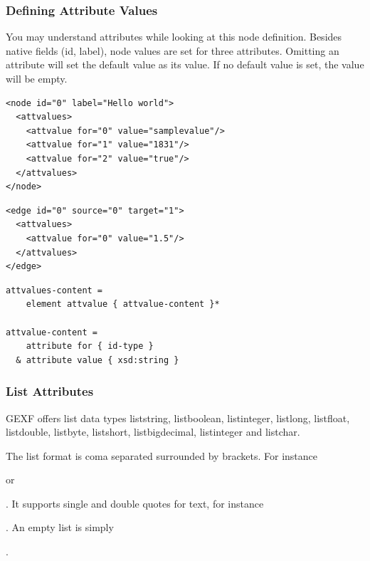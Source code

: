 \documentclass[a4paper,10pt]{article}
\begin{document}
\subsubsection{Defining Attribute Values}

You may understand attributes while looking at this node definition. Besides native fields (id, label), node values are set for three attributes. Omitting an attribute will set the default value as its value. If no default value is set, the value will be empty.

\lstset{ style=gexf }
\begin{lstlisting}[caption={Node Attributes},label=nodeattributes]
<node id="0" label="Hello world">
  <attvalues>
    <attvalue for="0" value="samplevalue"/>
    <attvalue for="1" value="1831"/>
    <attvalue for="2" value="true"/>
  </attvalues>
</node>
\end{lstlisting}

\lstset{ style=gexf }
\begin{lstlisting}[caption={Edge Attributes},label=edgeattributes]
<edge id="0" source="0" target="1">
  <attvalues>
    <attvalue for="0" value="1.5"/>
  </attvalues>
</edge>
\end{lstlisting}

\lstset{ style=rnc }
\begin{lstlisting}[caption={Attribute Values Specification},label=attributeValuesRNC]
attvalues-content =
    element attvalue { attvalue-content }*

attvalue-content =
    attribute for { id-type }
  & attribute value { xsd:string }
\end{lstlisting}

\subsubsection{List Attributes}

GEXF offers list data types liststring, listboolean, listinteger, listlong, listfloat, listdouble, listbyte, listshort, listbigdecimal, listinteger and listchar.

The list format is coma separated surrounded by brackets. For instance \begin{footnotesize}[1, 2, 3]\end{footnotesize} or \begin{footnotesize}\end{footnotesize}. It supports single and double quotes for text, for instance \begin{footnotesize}\end{footnotesize}. An empty list is simply \begin{footnotesize}[]\end{footnotesize}.
\end{document}
